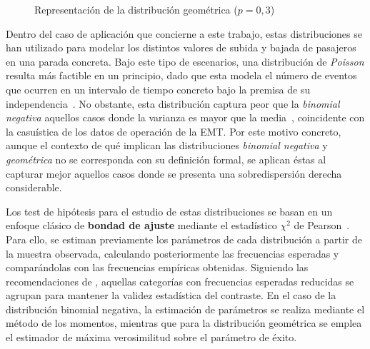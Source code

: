 \begin{figure}[h]
\centering
{}
\caption{Representación de la distribución geométrica 
($p=0{,}3$)}
\par\vspace{2pt}{\footnotesize Fuente: elaboración propia.}\label{fig:geometric}
\end{figure}


Dentro del caso de aplicación que concierne a este trabajo, estas distribuciones se han utilizado para 
modelar los distintos valores de subida y bajada de pasajeros en una parada concreta. Bajo este tipo de 
escenarios, una distribución de \textit{Poisson} resulta más factible en un principio, dado que esta modela 
el número de eventos que ocurren en un intervalo de tiempo
concreto bajo la premisa de su independencia~\cite{cameron2013regression}. No obstante, esta distribución 
captura peor que la \textit{binomial negativa} aquellos casos donde la varianza es mayor que la 
media~\cite{cameron2013regression}, coincidente con la casuística de los datos de operación de la EMT.\@
Por este motivo concreto, aunque el contexto de qué implican las distribuciones \textit{binomial negativa} 
y \textit{geométrica} no se corresponda con su definición formal, se aplican éstas al capturar mejor aquellos 
casos donde se presenta una sobredispersión derecha considerable.


Los test de hipótesis para el estudio de estas distribuciones se basan en un enfoque clásico de 
\textbf{bondad de ajuste} mediante el estadístico $\chi^2$ de Pearson~\cite{pearson1900criterion}. 
Para ello, se estiman previamente los parámetros de cada distribución a partir de la muestra observada, 
calculando posteriormente las frecuencias esperadas y comparándolas con las frecuencias empíricas 
obtenidas. Siguiendo las recomendaciones de \textcite{cochran1954methods}, aquellas categorías con 
frecuencias esperadas reducidas se agrupan para mantener la validez estadística del contraste. En el 
caso de la distribución binomial negativa, la estimación de parámetros se realiza mediante el método 
de los momentos, mientras que para la distribución geométrica se emplea el estimador de máxima 
verosimilitud sobre el parámetro de éxito.

